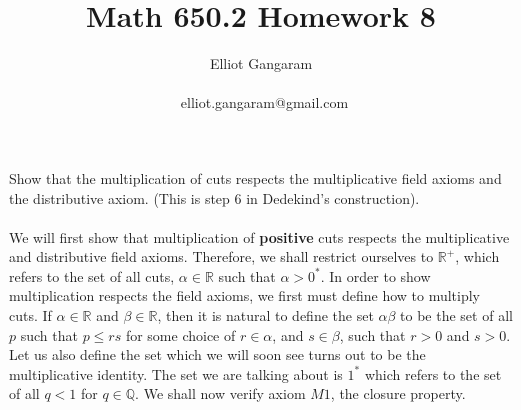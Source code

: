 \documentclass[12pt]{article}
\title{Math 650.2 Homework 8}
\author{Elliot Gangaram\\
\date{}
\ elliot.gangaram@gmail.com \\}
\begin{document}
\maketitle

\problem Show that the multiplication of cuts respects the multiplicative field axioms and the distributive axiom. (This is step 6 in Dedekind's construction). \\ \\

We will first show that multiplication of \textbf{positive} cuts respects the multiplicative and distributive field axioms. Therefore, we shall restrict ourselves to $\mathbb{R}^{+}$, which refers to the set of all cuts, $\alpha \in \mathbb{R}$ such that $\alpha > 0^{*}$. In order to show multiplication respects the field axioms, we first must define how to multiply cuts. If $\alpha \in \mathbb{R}$ and $\beta \in \mathbb{R}$, then it is natural to define the set $\alpha \beta$ to be the set of all $p$ such that $p \leq rs$ for some choice of $r \in \alpha$, and $s \in \beta$, such that $r>0$ and $s>0$. Let us also define the set which we will soon see turns out to be the multiplicative identity. The set we are talking about is $1^{*}$ which refers to the set of all $q<1$ for $q \in \mathbb{Q}$. We shall now verify axiom $M1$, the closure property. \\ \\
\end{document}
